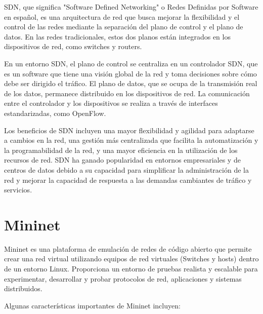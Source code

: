 \documentclass[a4paper, 12pt]{book}
\begin{document}
	SDN, que significa "Software Defined Networking" o Redes Definidas por Software en español, es una arquitectura de red que busca mejorar la flexibilidad y el control de las redes mediante la separación del plano de control y el plano de datos. En las redes tradicionales, estos dos planos están integrados en los dispositivos de red, como switches y routers.
	
	En un entorno SDN, el plano de control se centraliza en un controlador SDN, que es un software que tiene una visión global de la red y toma decisiones sobre cómo debe ser dirigido el tráfico. El plano de datos, que se ocupa de la transmisión real de los datos, permanece distribuido en los dispositivos de red. La comunicación entre el controlador y los dispositivos se realiza a través de interfaces estandarizadas, como OpenFlow.
	
	Los beneficios de SDN incluyen una mayor flexibilidad y agilidad para adaptarse a cambios en la red, una gestión más centralizada que facilita la automatización y la programabilidad de la red, y una mayor eficiencia en la utilización de los recursos de red. SDN ha ganado popularidad en entornos empresariales y de centros de datos debido a su capacidad para simplificar la administración de la red y mejorar la capacidad de respuesta a las demandas cambiantes de tráfico y servicios.
	
	\section{Mininet} 
	\label{sec:mininet}
	
	Mininet es una plataforma de emulación de redes de código abierto que permite crear una red virtual utilizando equipos de red virtuales (Switches y hosts) dentro de un entorno Linux. Proporciona un entorno de pruebas realista y escalable para experimentar, desarrollar y probar protocolos de red, aplicaciones y sistemas distribuidos.
	
	Algunas características importantes de Mininet incluyen:
	
\end{document}
